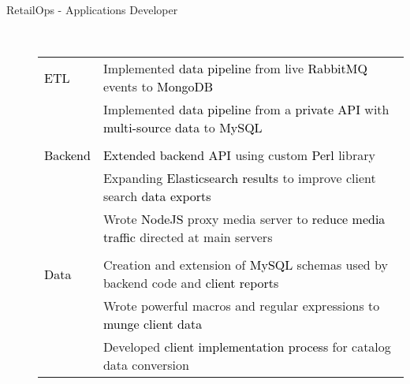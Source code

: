 \documentclass[12pt]{article}
\begin{document}
\begin{description}
\begin{description}
                \item[RetailOps - Applications Developer] \hfill\\
                \textcolor{gray}{
                    \begin{tabular}{l|l}
                        \\[-1.0mm]
                        \textcolor{black}{ETL}
                            & Implemented \textcolor{black}{data pipeline} from live \textcolor{black}{RabbitMQ} events to \textcolor{black}{MongoDB}\\
                            & Implemented \textcolor{black}{data pipeline} from a \textcolor{black}{private API} with \textcolor{black}{multi-source data} to \textcolor{black}{MySQL}\\
                        \\[-1.7mm]
                        \textcolor{black}{Backend}
                            & \textcolor{black}{Extended backend API} using custom \textcolor{black}{Perl} library\\
                            & Expanding \textcolor{black}{Elasticsearch results} to improve client search \textcolor{black}{data exports}\\
                            & Wrote \textcolor{black}{NodeJS} proxy media server to \textcolor{black}{reduce media traffic} directed at main servers \\
                        \\[-1.7mm]
                        \textcolor{black}{Data}
                            & Creation and extension of \textcolor{black}{MySQL} schemas used by backend code and \textcolor{black}{client reports}\\
                            & Wrote powerful macros and regular expressions to \textcolor{black}{munge client data}\\
                            & Developed \textcolor{black}{client implementation process} for catalog data conversion\\
                    \end{tabular}
		        }
            \end{description}


\end{description}
\end{document}
